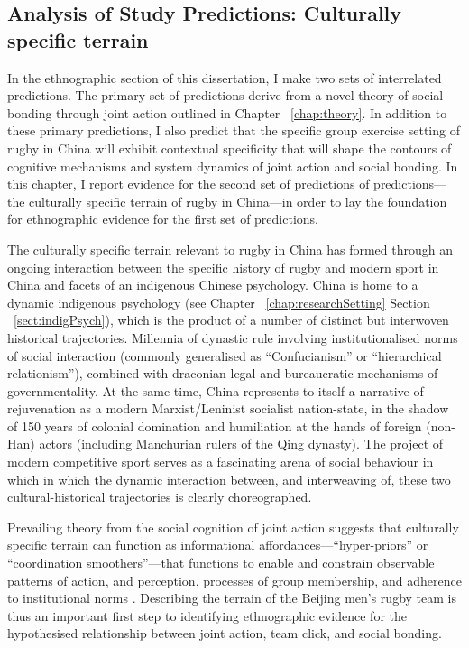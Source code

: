                                           \begin{CJK}{UTF8}{gbsn}




\section{Analysis of Study Predictions: Culturally specific terrain}

In the ethnographic section of this dissertation, I make two sets of interrelated predictions.  The primary set of predictions derive from a novel theory of social bonding through joint action outlined in Chapter ~\ref{chap:theory}.  In addition to these primary predictions, I also predict that the specific group exercise setting of rugby in China will exhibit contextual specificity that will shape the contours of cognitive mechanisms and system dynamics of joint action and social bonding.  In this chapter, I report evidence for the second set of predictions of predictions---the culturally specific terrain of rugby in China---in order to lay the foundation for ethnographic evidence for the first set of predictions.

The culturally specific terrain relevant to rugby in China has formed through an ongoing interaction between the specific history of rugby and modern sport in China and facets of an indigenous Chinese psychology.  China is home to a dynamic indigenous psychology (see Chapter ~\ref{chap:researchSetting} Section ~\ref{sect:indigPsych}), which is the product of a number of distinct but interwoven historical trajectories.   Millennia of dynastic rule involving institutionalised norms of social interaction (commonly generalised as ``Confucianism'' or ``hierarchical relationism''), combined with draconian legal and bureaucratic mechanisms of governmentality.  At the same time, China represents to itself a narrative of rejuvenation as a modern Marxist/Leninist socialist nation-state, in the shadow of 150 years of colonial domination and humiliation at the hands of foreign (non-Han) actors (including Manchurian rulers of the Qing dynasty).  The project of modern competitive sport serves as a fascinating arena of social behaviour in which in which the dynamic interaction between, and interweaving of, these two cultural-historical trajectories is clearly choreographed.

Prevailing theory from the social cognition of joint action suggests that culturally specific terrain can function as informational affordances---``hyper-priors'' or ``coordination smoothers''---that functions to enable and constrain observable patterns of action, and perception, processes of group membership, and adherence to institutional norms \citep{Clark2015}.  Describing the terrain of the Beijing men's rugby team is thus an important first step to identifying ethnographic evidence for the hypothesised relationship between joint action, team click, and social bonding.


\end{CJK}
